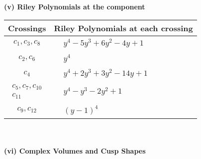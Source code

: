 \documentclass[1p]{elsarticle_modified}
\theoremstyle{definition}
\begin{document}
\newpage\renewcommand{\arraystretch}{1}
\flushleft \textbf{(v) Riley Polynomials at the component}\newline \\
\begin{tabular}{m{50pt}|m{274pt}}
Crossings & \hspace{64pt}Riley Polynomials at each crossing \\
\hline $$\begin{aligned}c_{1},c_{3},c_{8}\end{aligned}$$&$\begin{aligned}
&y^4-5 y^3+6 y^2-4 y+1
\end{aligned}$\\
\hline $$\begin{aligned}c_{2},c_{6}\end{aligned}$$&$\begin{aligned}
&y^4
\end{aligned}$\\
\hline $$\begin{aligned}c_{4}\end{aligned}$$&$\begin{aligned}
&y^4+2 y^3+3 y^2-14 y+1
\end{aligned}$\\
\hline $$\begin{aligned}c_{5},c_{7},c_{10}\\c_{11}\end{aligned}$$&$\begin{aligned}
&y^4- y^3-2 y^2+1
\end{aligned}$\\
\hline $$\begin{aligned}c_{9},c_{12}\end{aligned}$$&$\begin{aligned}
&(y-1)^4
\end{aligned}$\\
\hline
\end{tabular}\\~\\
\newpage\flushleft \textbf{(vi) Complex Volumes and Cusp Shapes}
\end{document}
